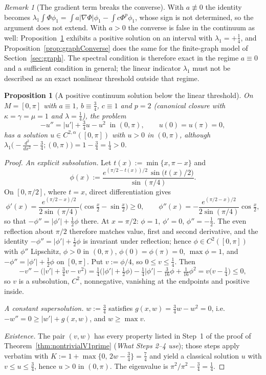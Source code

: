 \documentclass[11pt]{article}
\theoremstyle{plain}
\newtheorem{proposition}[theorem]{Proposition}
\theoremstyle{definition}
\theoremstyle{remark}
\newtheorem{remark}[theorem]{Remark}
\begin{document}
\begin{remark}[The gradient term breaks the converse]\label{rem:converseGradient}
With \(a\not\equiv 0\) the identity becomes \(\lambda_1\int\Phi\phi_1=\int a|\nabla\Phi|\phi_1-\int c\Phi^p\phi_1\), whose sign is not determined, so the argument does not extend. With \(a>0\) the converse is false in the continuum as well: Proposition~\ref{prop:continuumConverse} exhibits a positive solution on an interval with \(\lambda_1=+\tfrac14\), and Proposition~\ref{prop:graphConverse} does the same for the finite-graph model of Section~\ref{sec:graph}. The spectral condition is therefore exact in the regime \(a\equiv 0\) and a sufficient condition in general; the linear indicator \(\lambda_1\) must not be described as an exact nonlinear threshold outside that regime.
\end{remark}

\begin{proposition}[A positive continuum solution below the linear threshold]\label{prop:continuumConverse}
On \(M=[0,\pi]\) with \(a\equiv 1\), \(b\equiv\tfrac34\), \(c\equiv 1\) and \(p=2\) (canonical closure with \(\kappa=\gamma=\mu=1\) and \(\lambda=\tfrac14\)), the problem
\[
-u''=|u'|+\tfrac34u-u^2\ \text{ in }(0,\pi),\qquad u(0)=u(\pi)=0,
\]
has a solution \(u\in C^{2,\alpha}([0,\pi])\) with \(u>0\) in \((0,\pi)\), although \(\lambda_1\big(-\tfrac{d^2}{dx^2}-\tfrac34;(0,\pi)\big)=1-\tfrac34=\tfrac14>0\).
\end{proposition}
\begin{proof}
\emph{An explicit subsolution.} Let \(t(x):=\min\{x,\pi-x\}\) and
\[
\phi(x):=\frac{e^{(\pi/2-t(x))/2}\,\sin\big(t(x)/2\big)}{\sin(\pi/4)} .
\]
On \([0,\pi/2]\), where \(t=x\), direct differentiation gives
\[
\phi'(x)=\frac{e^{(\pi/2-x)/2}}{2\sin(\pi/4)}\big(\cos\tfrac x2-\sin\tfrac x2\big)\ge 0,\qquad
\phi''(x)=-\frac{e^{(\pi/2-x)/2}}{2\sin(\pi/4)}\cos\tfrac x2,
\]
so that \(-\phi''=|\phi'|+\tfrac12\phi\) there. At \(x=\pi/2\): \(\phi=1\), \(\phi'=0\), \(\phi''=-\tfrac12\). The even reflection about \(\pi/2\) therefore matches value, first and second derivative, and the identity \(-\phi''=|\phi'|+\tfrac12\phi\) is invariant under reflection; hence \(\phi\in C^{2}([0,\pi])\) with \(\phi''\) Lipschitz, \(\phi>0\) in \((0,\pi)\), \(\phi(0)=\phi(\pi)=0\), \(\max\phi=1\), and \(-\phi''=|\phi'|+\tfrac12\phi\) on \([0,\pi]\). Put \(v:=\phi/4\), so \(0\le v\le\tfrac14\). Then
\[
-v''-\big(|v'|+\tfrac34v-v^2\big)=\tfrac14\big(|\phi'|+\tfrac12\phi\big)-\tfrac14|\phi'|-\tfrac3{16}\phi+\tfrac1{16}\phi^2
=v\big(v-\tfrac14\big)\le 0,
\]
so \(v\) is a subsolution, \(C^2\), nonnegative, vanishing at the endpoints and positive inside.

\emph{A constant supersolution.} \(w:=\tfrac34\) satisfies \(g(x,w)=\tfrac34w-w^2=0\), i.e.\ \(-w''=0\ge |w'|+g(x,w)\), and \(w\ge\max v\).

\emph{Existence.} The pair \((v,w)\) has every property listed in Step~1 of the proof of Theorem~\ref{thm:nontrivialV1prime} (\emph{What Steps 2--4 use}); those steps apply verbatim with \(K:=1+\max\{0,\,2w-\tfrac34\}=\tfrac74\) and yield a classical solution \(u\) with \(v\le u\le\tfrac34\), hence \(u>0\) in \((0,\pi)\). The eigenvalue is \(\pi^2/\pi^2-\tfrac34=\tfrac14\).
\end{proof}
\end{document}
